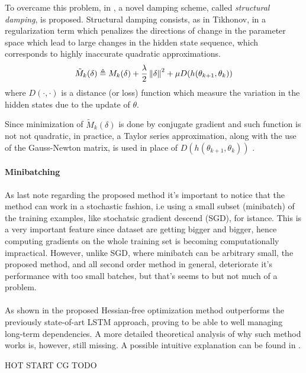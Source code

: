 To overcame this problem, in \cite{hessianFree}, a novel damping scheme, called \textit{structural damping}, is proposed.
Structural damping consists, as in Tikhonov, in a regularization term which  penalizes the directions of change in the parameter space which lead to large changes in the hidden state sequence, which corresponds to highly inaccurate quadratic approximations.
\begin{equation}
 \tilde{M}_k(\delta) \triangleq  M_k(\delta) + \frac{\lambda}{2} \left\Vert \delta \right\Vert^2 + \mu D(h(\theta_{k+1}, \theta_{k}))
\end{equation}
where $D(\cdot,\cdot)$ is a distance (or loss) function which measure the variation in the hidden states due to the update of $\theta$.

Since minimization of $\tilde{M}_k(\delta)$ is done by conjugate gradient and such function is not not quadratic, in practice, a Taylor series approximation, along with the use of the Gauss-Newton matrix, is used in place of $D(h(\theta_{k+1}, \theta_{k}))$ .

\paragraph{Minibatching}
As last note regarding the proposed method it's important to notice that the method can work in a stochastic fashion, 
i.e using a small subset (minibatch) of the training examples, like stochatsic gradient descend (SGD), for istance. This 
is a very important feature since dataset are getting bigger and bigger, hence computing gradients on the whole training 
set is becoming computationally impractical. However, unlike SGD, where minibatch can be arbitrary small, the proposed 
method, and all second order method in general, deteriorate it's performance with too small batches, but that's seems to 
but not much of a problem.
\\\\
As shown in \cite{hessianFree} the proposed Hessian-free optimization method outperforms the previously 
state-of-art LSTM\cite{lstm} approach, proving to be able to well managing long-term dependencies. A more detailed 
theoretical analysis of why such method works is, however, still missing. A possible intuitive explanation can be found 
in \cite{advancesInOptimizingRnns,pascanu}. 


HOT START CG TODO
